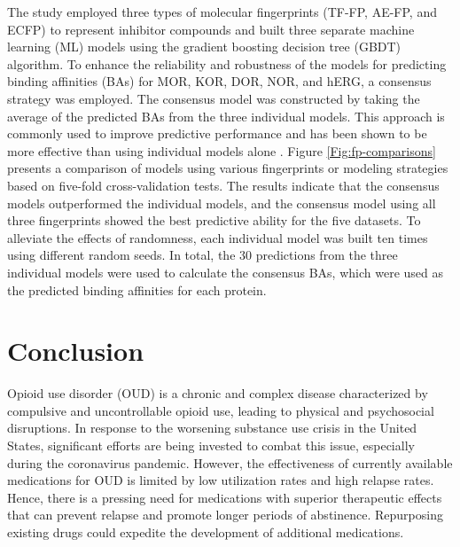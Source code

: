 \documentclass[10pt]{article}
\begin{document}
		The study employed three types of molecular fingerprints (TF-FP, AE-FP, and ECFP) to represent inhibitor compounds and built three separate machine learning (ML) models using the gradient boosting decision tree (GBDT) algorithm. To enhance the reliability and robustness of the models for predicting binding affinities (BAs) for MOR, KOR, DOR, NOR, and hERG, a consensus strategy was employed. The consensus model was constructed by taking the average of the predicted BAs from the three individual models. This approach is commonly used to improve predictive performance and has been shown to be more effective than using individual models alone \cite{zhang2022hergspred,gao20202d}. Figure \ref{Fig:fp-comparisons} presents a comparison of models using various fingerprints or modeling strategies based on five-fold cross-validation tests. The results indicate that the consensus models outperformed the individual models, and the consensus model using all three fingerprints showed the best predictive ability for the five datasets. To alleviate the effects of randomness, each individual model was built ten times using different random seeds. In total, the 30 predictions from the three individual models were used to calculate the consensus BAs, which were used as the predicted binding affinities for each protein.
		
		\section{Conclusion}
		
		Opioid use disorder (OUD) is a chronic and complex disease characterized by compulsive and uncontrollable opioid use, leading to physical and psychosocial disruptions. In response to the worsening substance use crisis in the United States, significant efforts are being invested to combat this issue, especially during the coronavirus pandemic. However, the effectiveness of currently available medications for OUD is limited by low utilization rates and high relapse rates. Hence, there is a pressing need for medications with superior therapeutic effects that can prevent relapse and promote longer periods of abstinence. Repurposing existing drugs could expedite the development of additional medications.
		
\end{document}
